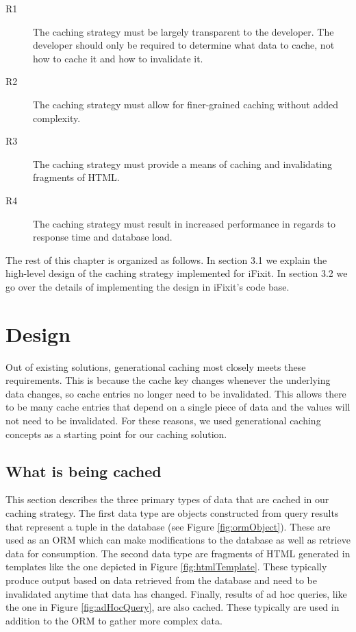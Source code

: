 \documentclass[12pt]{ucthesis}
\begin{document}
\begin{description}
   \item[R1] The caching strategy must be largely transparent to the developer.
             The developer should only be required to determine what data to cache, not how to cache it and how to invalidate it.
   \item[R2] The caching strategy must allow for finer-grained caching without added complexity.
   \item[R3] The caching strategy must provide a means of caching and invalidating fragments of HTML.
   \item[R4] The caching strategy must result in increased performance in regards to response time and database load.
\end{description}

The rest of this chapter is organized as follows.
In section 3.1 we explain the high-level design of the caching strategy implemented for \textsf{iFixit}.
In section 3.2 we go over the details of implementing the design in \textsf{iFixit}'s code base.

\section{Design}
Out of existing solutions, generational caching most closely meets these requirements.
This is because the cache key changes whenever the underlying data changes, so cache entries no longer need to be invalidated.
This allows there to be many cache entries that depend on a single piece of data and the values will not need to be invalidated.
For these reasons, we used generational caching concepts as a starting point for our caching solution.

\subsection{What is being cached}
This section describes the three primary types of data that are cached in our caching strategy.
The first data type are objects constructed from query results that represent a tuple in the database (see Figure \ref{fig:ormObject}).
These are used as an ORM which can make modifications to the database as well as retrieve data for consumption.
The second data type are fragments of HTML generated in templates like the one depicted in Figure \ref{fig:htmlTemplate}.
These typically produce output based on data retrieved from the database and need to be invalidated anytime that data has changed.
Finally, results of ad hoc queries, like the one in Figure \ref{fig:adHocQuery}, are also cached.
These typically are used in addition to the ORM to gather more complex data.
\end{document}
